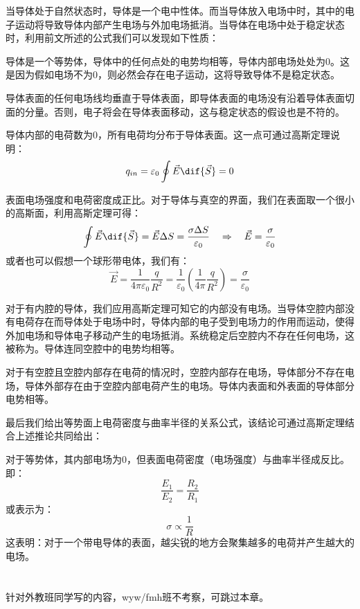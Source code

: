 当导体处于自然状态时，导体是一个电中性体。而当导体放入电场中时，其中的电子运动将导致导体内部产生电场与外加电场抵消。当导体在电场中处于稳定状态时，利用前文所述的公式我们可以发现如下性质：
\begin{Itemize}
    \item 导体是一个等势体，导体中的任何点处的电势均相等，导体内部电场处处为0。这是因为假如电场不为0，则必然会存在电子运动，这将导致导体不是稳定状态。
    \item 导体表面的任何电场线均垂直于导体表面，即导体表面的电场没有沿着导体表面切面的分量。否则，电子将会在导体表面移动，这与稳定状态的假设也是不符的。
    \item 导体内部的电荷数为0，所有电荷均分布于导体表面。这一点可通过高斯定理说明：
        \[q_{in}=\varepsilon_0\oint\vec{E}\dif{\vec{S}}=0\]
    \item 表面电场强度和电荷密度成正比。对于导体与真空的界面，我们在表面取一个很小的高斯面，利用高斯定理可得：
        \[\oint \vec{E}\dif{\vec{S}}=\vec{E}\Delta S=\dfrac{\sigma \Delta S}{\varepsilon_0}\quad\Rightarrow\quad \vec{E}=\dfrac{\sigma}{\varepsilon_0}\]
        或者也可以假想一个球形带电体，我们有：
        \[\vec{E}=\dfrac{1}{4\pi\varepsilon_0}\dfrac{q}{R^2}=\dfrac{1}{\varepsilon_0}(\dfrac{1}{4\pi}\dfrac{q}{R^2})=\dfrac{\sigma}{\varepsilon_0}\]
    \item 对于有内腔的导体，我们应用高斯定理可知它的内部没有电场。当导体空腔内部没有电荷存在而导体处于电场中时，导体内部的电子受到电场力的作用而运动，使得外加电场和导体电子移动产生的电场抵消。系统稳定后空腔内不存在任何电场，这被称为。导体连同空腔中的电势均相等。
    \item 对于有空腔且空腔内部存在电荷的情况时，空腔内部存在电场，导体部分不存在电场，导体外部存在由于空腔内部电荷产生的电场。导体内表面和外表面的导体部分电势相等。 
\end{Itemize}

最后我们给出等势面上电荷密度与曲率半径的关系公式，该结论可通过高斯定理结合上述推论共同给出：
\begin{law}
    对于等势体，其内部电场为0，但表面电荷密度（电场强度）与曲率半径成反比。即：
    \[\dfrac{E_1}{E_2}=\dfrac{R_2}{R_1}\]
    或表示为：
    \[\sigma\propto\dfrac{1}{R}\]
    这表明：对于一个带电导体的表面，越尖锐的地方会聚集越多的电荷并产生越大的电场。
\end{law}
\section[电像法]{}
针对外教班同学写的内容，wyw/fmh班不考察，可跳过本章。

